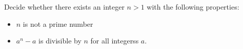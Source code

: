 Decide whether there exists an integer $n>1$ with the following properties:
\begin{itemize}
    \item $n$ is not a prime number
    \item $a^n-a$ is divisible by $n$ for all integerss $a$. 
\end{itemize}
